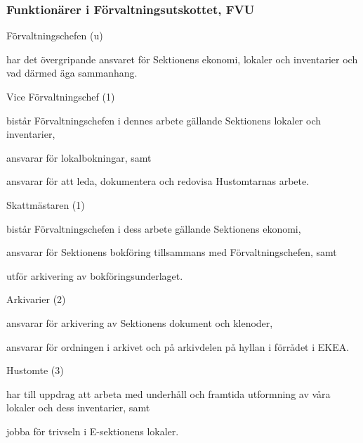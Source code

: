\documentclass[10pt]{article}
\begin{document}
\subsubsection{Funktionärer i Förvaltningsutskottet, FVU}
\begin{emptylist}
    \item Förvaltningschefen (u)
        \begin{dashlist}
            \item har det övergripande ansvaret för Sektionens ekonomi,
                lokaler och inventarier och vad därmed äga sammanhang.
        \end{dashlist}
    \item Vice Förvaltningschef (1)
        \begin{dashlist}
            \item bistår Förvaltningschefen i dennes arbete gällande Sektionens lokaler och inventarier,
            \item ansvarar för lokalbokningar, samt
            \item ansvarar för att leda, dokumentera och redovisa Hustomtarnas arbete.
        \end{dashlist}
    \item Skattmästaren (1)
        \begin{dashlist}
            \item bistår Förvaltningschefen i dess arbete gällande Sektionens ekonomi,
            \item ansvarar för Sektionens bokföring tillsammans med Förvaltningschefen, samt
            \item utför arkivering av bokföringsunderlaget.
        \end{dashlist}
    \item Arkivarier (2)
        \begin{dashlist}
            \item ansvarar för arkivering av Sektionens dokument och
                klenoder,
            \item ansvarar för ordningen i arkivet och på arkivdelen
                på hyllan i förrådet i EKEA.
        \end{dashlist}
    \item Hustomte (3)
        \begin{dashlist}
            \item har till uppdrag att arbeta med underhåll och framtida utformning  av våra lokaler och dess inventarier, samt
            \item jobba för trivseln i E-sektionens lokaler.

\end{dashlist}
\end{emptylist}
\end{document}
